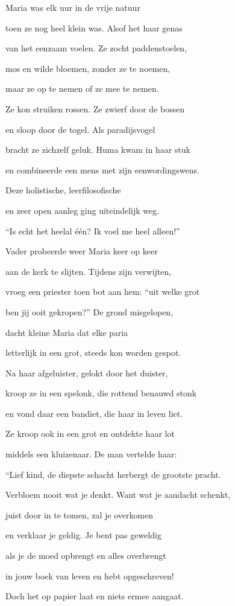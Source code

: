 Maria was elk uur
in de vrije natuur

toen ze nog heel klein was.
Alsof het haar genas

van het eenzaam voelen.
Ze zocht paddenstoelen,

mos en wilde bloemen,
zonder ze te noemen,

maar ze op te nemen
of ze mee te nemen.

Ze kon struiken rossen.
Ze zwierf door de bossen

en sloop door de togel.
Als paradijsvogel

bracht ze zichzelf geluk.
Huma kwam in haar stuk

en combineerde een mens
met zijn eenwordingswens.

Deze holistische,
leerfilosofische

en zeer open aanleg
ging uiteindelijk weg.

“Is echt het heelal één?
Ik voel me heel alleen!”

Vader probeerde weer
Maria keer op keer

aan de kerk te slijten.
Tijdens zijn verwijten,

vroeg een priester toen bot
aan hem: “uit welke grot

ben jij ooit gekropen?”
De grond misgelopen,

dacht kleine Maria
dat elke paria

letterlijk in een grot,
steeds kon worden gespot.

Na haar afgeluister,
gelokt door het duister,

kroop ze in een spelonk,
die rottend benauwd stonk

en vond daar een bandiet,
die haar in leven liet.

Ze kroop ook in een grot
en ontdekte haar lot

middels een kluizenaar.
De man vertelde haar:

“Lief kind, de diepste schacht
herbergt de grootste pracht.

Verbloem nooit wat je denkt.
Want wat je aandacht schenkt,

juist door in te tomen,
zal je overkomen

en verklaar je geldig.
Je bent pas geweldig

als je de moed opbrengt
en alles overbrengt

in jouw boek van leven
en hebt opgeschreven!

Doch het op papier laat
en niets ermee aangaat.

